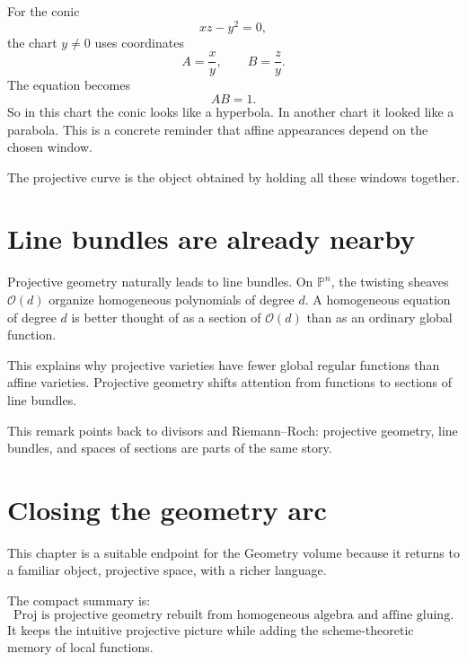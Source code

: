For the conic
\[
  xz-y^2=0,
\]
the chart \(y\ne0\) uses coordinates
\[
  A=\frac{x}{y},
  \qquad
  B=\frac{z}{y}.
\]
The equation becomes
\[
  AB=1.
\]
So in this chart the conic looks like a hyperbola.  In another chart it looked like a parabola.  This is a concrete reminder that affine appearances depend on the chosen window.

The projective curve is the object obtained by holding all these windows together.

\section{Line bundles are already nearby}

Projective geometry naturally leads to line bundles.  On \(\mathbb P^n\), the twisting sheaves \(\mathcal O(d)\) organize homogeneous polynomials of degree \(d\).  A homogeneous equation of degree \(d\) is better thought of as a section of \(\mathcal O(d)\) than as an ordinary global function.

This explains why projective varieties have fewer global regular functions than affine varieties.  Projective geometry shifts attention from functions to sections of line bundles.

This remark points back to divisors and Riemann--Roch: projective geometry, line bundles, and spaces of sections are parts of the same story.

\section{Closing the geometry arc}

This chapter is a suitable endpoint for the Geometry volume because it returns to a familiar object, projective space, with a richer language.

The compact summary is:
\[
  \text{Proj is projective geometry rebuilt from homogeneous algebra and affine gluing.}
\]
It keeps the intuitive projective picture while adding the scheme-theoretic memory of local functions.
